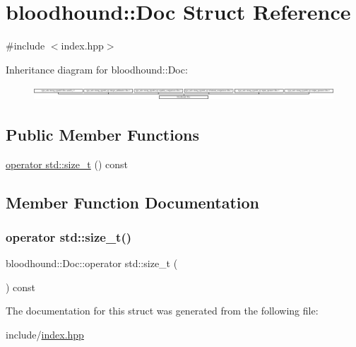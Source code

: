 \hypertarget{structbloodhound_1_1Doc}{}\section{bloodhound\+:\+:Doc Struct Reference}
\label{structbloodhound_1_1Doc}


{\ttfamily \#include $<$index.\+hpp$>$}

Inheritance diagram for bloodhound\+:\+:Doc\+:\begin{figure}[H]
\begin{center}
\leavevmode
\includegraphics[height=0.514233cm]{structbloodhound_1_1Doc}
\end{center}
\end{figure}
\subsection*{Public Member Functions}
\begin{DoxyCompactItemize}
\item 
\hyperlink{structbloodhound_1_1Doc_afb469079253eb5b66e0b613f873ae81d}{operator std\+::size\+\_\+t} () const
\end{DoxyCompactItemize}


\subsection{Member Function Documentation}
\mbox{\label{structbloodhound_1_1Doc_afb469079253eb5b66e0b613f873ae81d}} 
\subsubsection{\texorpdfstring{operator std\+::size\+\_\+t()}{operator std::size\_t()}}
{\footnotesize\ttfamily bloodhound\+::\+Doc\+::operator std\+::size\+\_\+t (\begin{DoxyParamCaption}{ }\end{DoxyParamCaption}) const\hspace{0.3cm}{\ttfamily [inline]}}



The documentation for this struct was generated from the following file\+:\begin{DoxyCompactItemize}
\item 
include/\hyperlink{index_8hpp}{index.\+hpp}\end{DoxyCompactItemize}
